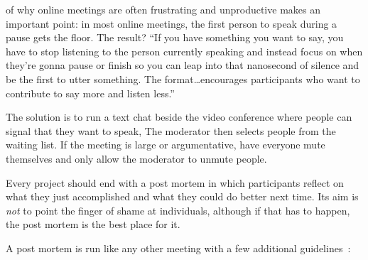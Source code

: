 
of why online meetings are often frustrating and unproductive
makes an important point:
in most online meetings,
the first person to speak during a pause gets the floor.
The result?
``If you have something you want to say,
you have to stop listening to the person currently speaking
and instead focus on when they're gonna pause or finish
so you can leap into that nanosecond of silence and be the first to utter something.
The format{\ldots}encourages participants who want to contribute to say more and listen less.''

The solution is to run a text chat beside the video conference
where people can signal that they want to speak,
The moderator then selects people from the waiting list.
If the meeting is large or argumentative,
have everyone mute themselves
and only allow the moderator to unmute people.


Every project should end with a post mortem
in which participants reflect on what they just accomplished
and what they could do better next time.
Its aim is \emph{not} to point the finger of shame at individuals,
although if that has to happen,
the post mortem is the best place for it.

A post mortem is run like any other meeting
with a few additional guidelines~\cite{Derb2006}:


